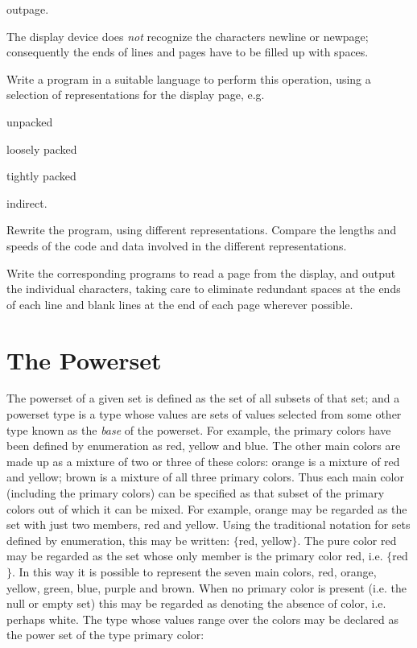 \quad outpage.

\noindent
The display device does \textit{not} recognize the characters newline or newpage; consequently the ends of lines and pages have to be filled up with spaces.

Write a program in a suitable language to perform this operation, using a selection of representations for the display page, e.g.

\quad unpacked

\quad loosely packed

\quad tightly packed

\quad indirect.

\noindent
Rewrite the program, using different representations. Compare the lengths and speeds of the code and data involved in the different representations.

Write the corresponding programs to read a page from the display, and output the individual characters, taking care to eliminate redundant spaces at the ends of each line and blank lines at the end of each page wherever possible.

\section[The powerset]{The Powerset}

The powerset of a given set is defined as the set of all subsets of that set; and a powerset type is a type whose values are sets of values selected from some other type known as the \textit{base} of the powerset. For example, the primary colors have been defined by enumeration as red, yellow and blue. The other main colors are made up as a mixture of two or three of these colors: orange is a mixture of red and yellow; brown is a mixture of all three primary colors. Thus each main color (including the primary colors) can be specified as that subset of the primary colors out of which it can be mixed. For example, orange may be regarded as the set with just two members, red and yellow. Using the traditional notation for sets defined by enumeration, this may be written: $\{$red, yellow$\}$. The pure color red may be regarded as the set whose only member is the primary color red, i.e. $\{$red$\}$. In this way it is possible to represent the seven main colors, red, orange, yellow, green, blue, purple and brown. When no primary color is present (i.e. the null or empty set) this may be regarded as denoting the absence of color, i.e. perhaps white. The type whose values range over the colors may be declared as the power set of the type primary color:

